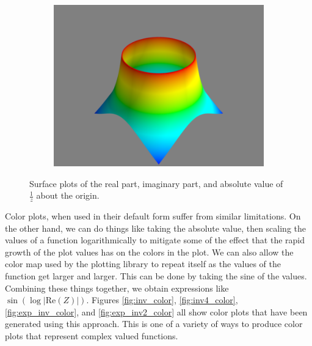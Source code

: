 \begin{figure}
\begin{subfigure}{.32\textwidth}
\includegraphics[width=\textwidth]{inv2_abs_surface.png}
\end{subfigure}
\caption{Surface plots of the real part, imaginary part, and absolute value of $\frac{1}{z}$ about the origin.}
\label{fig:inv2_surfaces}
\end{figure}

Color plots, when used in their default form suffer from similar limitations.
On the other hand, we can do things like taking the absolute value, then scaling the values of a function logarithmically to mitigate some of the effect that the rapid growth of the plot values has on the colors in the plot.
We can also allow the color map used by the plotting library to repeat itself as the values of the function get larger and larger.
This can be done by taking the sine of the values.
Combining these things together, we obtain expressions like $\sin\left(\log\left|\text{Re}\left(Z\right)\right|\right)$.
Figures \ref{fig:inv_color}, \ref{fig:inv4_color}, \ref{fig:exp_inv_color}, and \ref{fig:exp_inv2_color} all show color plots that have been generated using this approach.
This is one of a variety of ways to produce color plots that represent complex valued functions.

